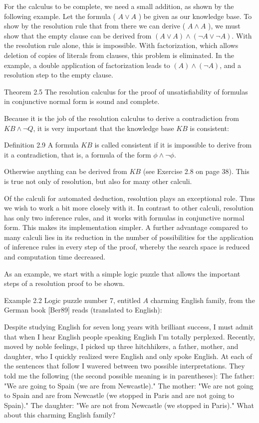 \documentclass[10pt]{book}
\begin{document}
For the calculus to be complete, we need a small addition, as shown by the following example. Let the formula ( $A \vee A$ ) be given as our knowledge base. To show by the resolution rule that from there we can derive ( $A \wedge A$ ), we must show that the empty clause can be derived from $(A \vee A) \wedge(\neg A \vee \neg A)$. With the resolution rule alone, this is impossible. With factorization, which allows deletion of copies of literals from clauses, this problem is eliminated. In the example, a double application of factorization leads to $(A) \wedge(\neg A)$, and a resolution step to the empty clause.

\begin{displayquote}
Theorem 2.5 The resolution calculus for the proof of unsatisfiability of formulas in conjunctive normal form is sound and complete.
\end{displayquote}

Because it is the job of the resolution calculus to derive a contradiction from $K B \wedge \neg Q$, it is very important that the knowledge base $K B$ is consistent:

Definition 2.9 A formula $K B$ is called consistent if it is impossible to derive from it a contradiction, that is, a formula of the form $\phi \wedge \neg \phi$.

Otherwise anything can be derived from $K B$ (see Exercise 2.8 on page 38). This is true not only of resolution, but also for many other calculi.

Of the calculi for automated deduction, resolution plays an exceptional role. Thus we wish to work a bit more closely with it. In contrast to other calculi, resolution has only two inference rules, and it works with formulas in conjunctive normal form. This makes its implementation simpler. A further advantage compared to many calculi lies in its reduction in the number of possibilities for the application of inference rules in every step of the proof, whereby the search space is reduced and computation time decreased.

As an example, we start with a simple logic puzzle that allows the important steps of a resolution proof to be shown.

Example 2.2 Logic puzzle number 7, entitled $A$ charming English family, from the German book [Ber89] reads (translated to English):


Despite studying English for seven long years with brilliant success, I must admit that when I hear English people speaking English I'm totally perplexed. Recently, moved by noble feelings, I picked up three hitchhikers, a father, mother, and daughter, who I quickly realized were English and only spoke English. At each of the sentences that follow I wavered between two possible interpretations. They told me the following (the second possible meaning is in parentheses): The father: "We are going to Spain (we are from Newcastle)." The mother: "We are not going to Spain and are from Newcastle (we stopped in Paris and are not going to Spain)." The daughter: "We are not from Newcastle (we stopped in Paris)." What about this charming English family?
\end{document}
